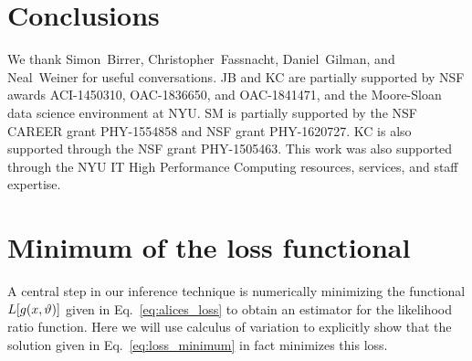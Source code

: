 \documentclass[twocolumn]{aastex62}
\begin{document}
\section{Conclusions}
\label{sec:conclusions}


\acknowledgements

We thank Simon~Birrer, Christopher~Fassnacht, Daniel~Gilman, and Neal~Weiner for useful conversations. JB and KC are partially supported by NSF awards ACI-1450310, OAC-1836650, and OAC-1841471, and the Moore-Sloan data science environment at NYU. SM is partially supported by the NSF CAREER grant PHY-1554858 and NSF grant PHY-1620727. KC is also supported through the NSF grant PHY-1505463. This work was also supported through the NYU IT High Performance Computing resources, services, and staff expertise.



\appendix
\section{Minimum of the loss functional}
\label{app:variation}

A central step in our inference technique is numerically minimizing the functional $L[g(x, \vartheta)]$ given in Eq.~\eqref{eq:alices_loss} to obtain an estimator for the likelihood ratio function. Here we will use calculus of variation to explicitly show that the solution given in Eq.~\eqref{eq:loss_minimum} in fact minimizes this loss.
\end{document}
